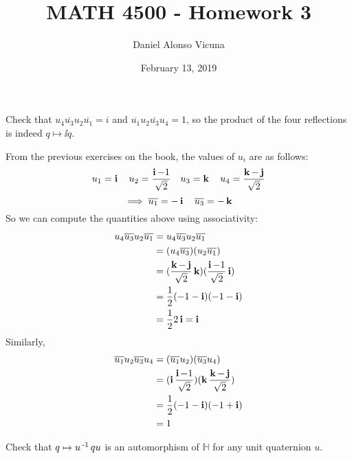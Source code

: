 \documentclass[11pt,onecolumn]{article}
\title{MATH 4500 - Homework 3}
\author{Daniel Alonso Vicuna}
\date{February 13, 2019}
\begin{document}
\maketitle

\begin{exercise}
 Check that $u_4\overline{u_3}u_2\overline{u_1} = i$ and $\overline{u_1}u_2\overline{u_3}u_4 = 1$, so the product of the four reﬂections is indeed $q\mapsto \ii q$.
\end{exercise}
\begin{answer}
From the previous exercises on the book, the values of $u_i$ are as follows:
$$ u_1 = \operatorname{\textbf{i}} \quad u_2 = \frac{\operatorname{\textbf{i}}-1}{\sqrt{2}} \quad u_3 = \operatorname{\textbf{k}} \quad u_4 = \frac{\operatorname{\textbf{k}} - \operatorname{\textbf{j}}}{\sqrt{2}}$$ 
$$ \implies \overline{u_1} = -\operatorname{\textbf{i}} \quad \overline{u_3} = -\operatorname{\textbf{k}} $$
So we can compute the quantities above using associativity:
\begin{align*}
    u_4\overline{u_3}u_2\overline{u_1} &= u_4\overline{u_3}u_2\overline{u_1}\\
    &= (u_4\overline{u_3})(u_2\overline{u_1}) \\
    &= (\frac{\operatorname{\textbf{k}} - \operatorname{\textbf{j}}}{\sqrt{2}} \operatorname{\textbf{k}})(\frac{\operatorname{\textbf{i}}-1}{\sqrt{2}} \operatorname{\textbf{i}})\\
    &= \frac{1}{2} (-1-\operatorname{\textbf{i}})(-1-\operatorname{\textbf{i}}) \\
    &= \frac{1}{2}2\operatorname{\textbf{i}} = \operatorname{\textbf{i}}
\end{align*}
Similarly,
\begin{align*}
    \overline{u_1}u_2\overline{u_3}u_4 &= (\overline{u_1}u_2)(\overline{u_3}u_4) \\
    &= (\operatorname{\textbf{i}} \frac{\operatorname{\textbf{i}}-1}{\sqrt{2}} )(\operatorname{\textbf{k}} \frac{\operatorname{\textbf{k}} - \operatorname{\textbf{j}}}{\sqrt{2}} ) \\
    &=\frac{1}{2} (-1-\operatorname{\textbf{i}})(-1+\operatorname{\textbf{i}}) \\
    &= 1
\end{align*}
\end{answer}
\begin{exercise}
Check that $q\mapsto u\operatorname{^{-1}} qu$ is an automorphism of $\mathbb{H}$ for any unit quaternion $u$. 
\end{exercise}
\end{document}
